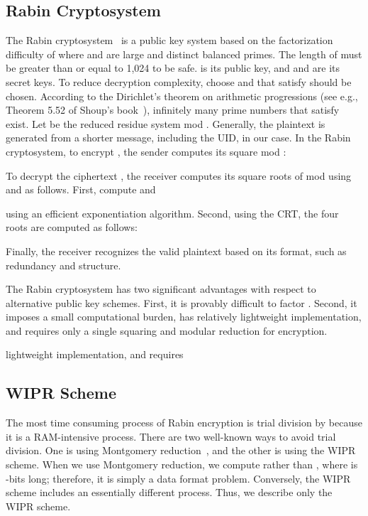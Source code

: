 \documentclass{article}
\begin{document}
\subsection{Rabin Cryptosystem}\label{Rabin}
The Rabin cryptosystem~\cite{Rabin} is a public key system based on the factorization 
difficulty of  where  and  are large and distinct balanced primes. 
The length  of  must be greater than or equal to 1,024 to be safe.
 is its public key, and  and  are its secret keys. 
To reduce decryption complexity, choose  and  that satisfy 
 should be chosen. 
According to the Dirichlet's theorem on arithmetic progressions
(see e.g., Theorem 5.52 of Shoup's book~\cite{Shoup}), 
infinitely many prime numbers  that satisfy  exist. 
Let  be the reduced residue system mod .
Generally, the plaintext  is generated from a shorter message, including 
the UID, in our case. 
In the Rabin cryptosystem, to encrypt , the sender computes its square mod :
 

To decrypt the ciphertext , the receiver computes its square roots  
of  mod  using  and  as follows.
First, compute 
 and 

using an efficient exponentiation algorithm.
Second, using the CRT, 
the four roots are computed as follows:

Finally, 
the receiver recognizes the valid plaintext based on its format, such as redundancy and structure.

The Rabin cryptosystem has two significant advantages with respect to 
alternative public key schemes. 
First, it is provably difficult to factor . 
Second, it imposes a small computational burden, 
has relatively 
lightweight implementation, and requires only a single squaring and modular reduction 
for encryption.

lightweight implementation, and requires


\subsection{WIPR Scheme}
The most time consuming process of Rabin encryption is trial division by  
because it is a RAM-intensive process. 
There are two well-known ways to avoid trial division. 
One is using Montgomery reduction~\cite{Mont}, 
and the other is using the WIPR scheme.
When we use Montgomery reduction, we 
compute  rather than , 
where  is -bits long; therefore, it is simply a data format problem. 
Conversely, the WIPR scheme includes an essentially different process.
Thus, we describe only the WIPR scheme.
\end{document}
